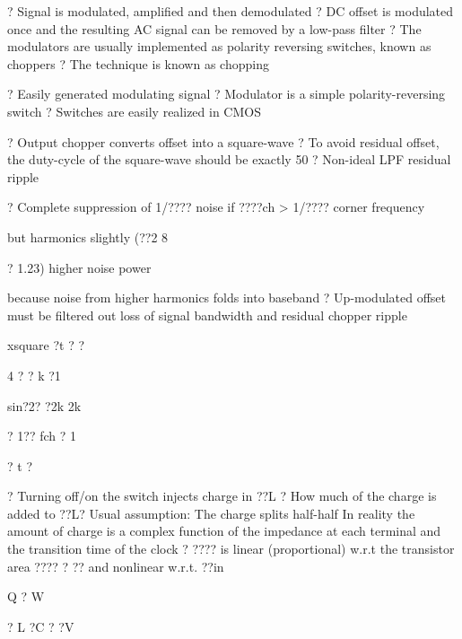 \documentclass[2pt,landscape]{article}
\begin{document}
\begin{multicols*}{5}
?	Signal is modulated, amplified and then demodulated
?	DC offset is modulated once and the resulting AC signal can be 
removed by a low-pass filter
?	The modulators are usually implemented as polarity reversing 
switches, known as choppers
?	The technique is known as chopping








?	Easily generated modulating signal
?	Modulator is a simple polarity-reversing switch
?	Switches are easily realized in CMOS








?	Output chopper converts offset into a square-wave
?	To avoid residual offset, the duty-cycle of the square-wave 
should be exactly 50%
?	Non-ideal LPF	residual ripple






?	Complete suppression of 1/???? noise if ????ch  > 1/???? corner frequency


but harmonics	slightly (??2
8


? 1.23) higher noise power


because noise from higher harmonics folds into baseband
?	Up-modulated offset must be filtered out
loss of signal bandwidth and residual chopper \textbullet ripple\textbullet 













xsquare ?t ? ?


4 ?
?	k ?1


sin?2? ?2k
2k


? 1?? fch
? 1


? t ?



?	Turning off/on the switch injects charge in ??L
?	How much of the charge is added to ??L?
\textbullet 	Usual assumption:
The charge splits half-half
\textbullet 	In reality the amount of charge is a complex function of
the impedance at each terminal and the transition time of the clock
?	???? is linear (proportional) w.r.t the transistor area ???? ? ?? and nonlinear
w.r.t. ??in


Q ? W


? L ?C	? ?V



\end{multicols*}
\end{document}
